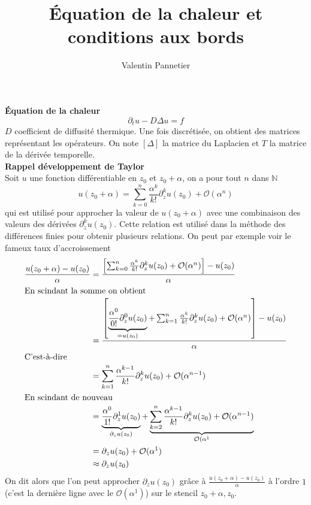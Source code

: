 \documentclass[11pt,a4paper]{article}
\title{Équation de la chaleur et conditions aux bords}
\author{Valentin Pannetier}
\begin{document}
\maketitle
\noindent \textbf{Équation de la chaleur}
\begin{equation}
    \partial_t u - D \Delta u = f
\end{equation}
$D$ coefficient de diffusité thermique. Une fois discrétisée, on obtient des matrices représentant les opérateurs. On note $[\Delta]$ la matrice du Laplacien et $T$ la matrice de la dérivée temporelle.\\

\noindent \textbf{Rappel développement de Taylor}\\
Soit $u$ une fonction différentiable en $z_0$ et $z_0+\alpha$, on a pour tout $n$ dans $\mathbb{N}$
\begin{equation}
    u(z_0+\alpha) = \sum_{k=0}^{n} \frac{\alpha^k}{k!} \partial_{z}^k u(z_0) + \mathcal{O}(\alpha^n)
\end{equation}
qui est utilisé pour approcher la valeur de $u(z_0+\alpha)$ avec une combinaison des valeurs des dérivées $\partial_z^k u(z_0)$. Cette relation est utilisé dans la méthode des différences finies pour obtenir plusieurs relations. On peut par exemple voir le fameux taux d'accroissement
\begin{align}
    \frac{u(z_0 + \alpha) - u(z_0)}{\alpha} &=  \frac{\left[\sum_{k=0}^{n} \frac{\alpha^k}{k!} \partial_{z}^k u(z_0) + \mathcal{O}(\alpha^n)\right] - u(z_0)}{\alpha}\\
    \intertext{En scindant la somme on obtient}
    &= \frac{\left[\underbrace{\frac{\alpha^0}{0!}\partial_z^0u(z_0)}_{=u(z_0)}+ \sum_{k=1}^{n} \frac{\alpha^k}{k!} \partial_{z}^k u(z_0) + \mathcal{O}(\alpha^n)\right] - u(z_0)}{\alpha}\\
    \intertext{C'est-à-dire}
    &=\sum_{k=1}^{n} \frac{\alpha^{k-1}}{k!} \partial_{z}^k u(z_0) + \mathcal{O}(\alpha^{n-1})\\
    \intertext{En scindant de nouveau}
    &= \underbrace{\frac{\alpha^{0}}{1!} \partial_{z}^1 u(z_0)}_{\partial_z u(z_0)} + \underbrace{\sum_{k=2}^{n} \frac{\alpha^{k-1}}{k!} \partial_{z}^k u(z_0) + \mathcal{O}(\alpha^{n-1})}_{\mathcal{O}(\alpha^{1}}\\
    &= \partial_z u(z_0) + \mathcal{O}(\alpha^{1})\\ &\approx \partial_z u(z_0)
\end{align}
On dit alors que l'on peut approcher $\partial_z u(z_0)$ grâce à $\frac{u(z_0 + \alpha) - u(z_0)}{\alpha}$ à l'ordre $1$ (c'est la dernière ligne avec le $\mathcal{O}(\alpha^{1})$) sur le stencil $z_0+\alpha, z_0$.\\
\end{document}
